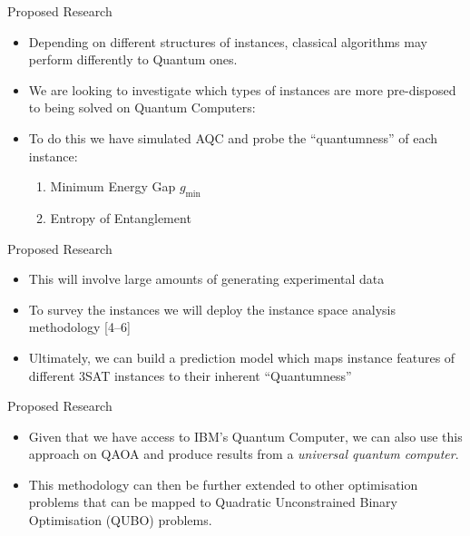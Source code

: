 \documentclass[
  ignorenonframetext,
]{beamer}
\providecommand{\tightlist}{%
  \setlength{\itemsep}{0pt}\setlength{\parskip}{0pt}}
\begin{document}
\begin{frame}{Proposed Research}
\protect\hypertarget{proposed-research}{}

\begin{itemize}[<+->]
\tightlist
\item
  Depending on different structures of instances, classical algorithms
  may perform differently to Quantum ones.
\item
  We are looking to investigate which types of instances are more
  pre-disposed to being solved on Quantum Computers:
\item
  To do this we have simulated AQC and probe the ``quantumness'' of each
  instance:

  \begin{enumerate}[<+->]
  \tightlist
  \item
    Minimum Energy Gap \(g_{\text{min}}\)
  \item
    Entropy of Entanglement
  \end{enumerate}
\end{itemize}

\end{frame}

\begin{frame}{Proposed Research}
\protect\hypertarget{proposed-research-1}{}

\begin{itemize}[<+->]
\tightlist
\item
  This will involve large amounts of generating experimental data
\item
  To survey the instances we will deploy the instance space analysis
  methodology {[}4--6{]}
\item
  Ultimately, we can build a prediction model which maps instance
  features of different 3SAT instances to their inherent ``Quantumness''
\end{itemize}

\end{frame}

\begin{frame}{Proposed Research}
\protect\hypertarget{proposed-research-2}{}

\begin{itemize}[<+->]
\tightlist
\item
  Given that we have access to IBM's Quantum Computer, we can also use
  this approach on QAOA and produce results from a \emph{universal
  quantum computer}.
\item
  This methodology can then be further extended to other optimisation
  problems that can be mapped to Quadratic Unconstrained Binary
  Optimisation (QUBO) problems.
\end{itemize}

\end{frame}
\end{document}
